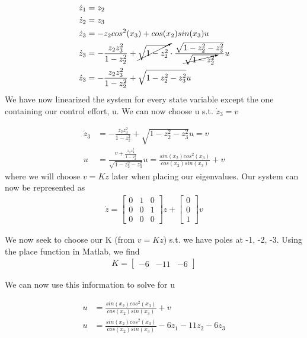 \documentclass{article}
\begin{document}
  \begin{align*}
    \dot{z}_1 &= z_2 \\
    \dot{z}_2 &= z_3 \\
    \dot{z}_3 &= -z_2cos^2(x_3) + cos(x_2)sin(x_3)u \\
    \dot{z}_3 &= -\frac{z_2z_3^2}{1-z_2^2} + \cancelto{}{\sqrt{1-z_2^2}}\cdot \frac{\sqrt{1-z_2^2-z_3^2}}{\cancelto{}{\sqrt{1-z_2^2}}}u \\
    \dot{z}_3 &= -\frac{z_2z_3^2}{1-z_2^2} + \sqrt{1-z_2^2-z_3^2}u
  \end{align*}
  We have now linearized the system for every state variable except the one
  containing our control effort, u. We can now choose u s.t. $\dot{z}_3 = v$ 

  \begin{align*}
    \dot{z}_3 &= -\frac{z_2z_3^2}{1-z_2^2} + \sqrt{1-z_2^2-z_3^2}u = v \\
    u &= \frac{v + \frac{z_2z_3^2}{1-z_2^2}}{\sqrt{1-z_2^2-z_3^2}} 
    u = \frac{sin(x_2)cos^2(x_3)}{cos(x_2)sin(x_3)} + v
  \end{align*}
  where we will choose $v=Kz$ later when placing our eigenvalues. \newline
  Our system can now be represented as
  \begin{align*}
    \dot{z} = \begin{bmatrix}
      0 & 1 & 0 \\
      0 & 0 & 1 \\
      0 & 0 & 0 
    \end{bmatrix}z +
          \begin{bmatrix}
            0 \\
            0 \\
            1
          \end{bmatrix}v
  \end{align*}

  We now seek to choose our K (from $v=Kz$) s.t. we have poles at -1, -2, -3.
  Using the place function in Matlab, we find
  \begin{align*}
    K = \begin{bmatrix}
          -6 & -11 & -6
        \end{bmatrix}
  \end{align*}

  We can now use this information to solve for u

  \begin{align*}
    u &= \frac{sin(x_2)cos^2(x_3)}{cos(x_2)sin(x_3)} + v \\
    u &= \frac{sin(x_2)cos^2(x_3)}{cos(x_2)sin(x_3)} - 6z_1 -11z_2 -6z_3 \\
  \end{align*}
   
\end{document}
